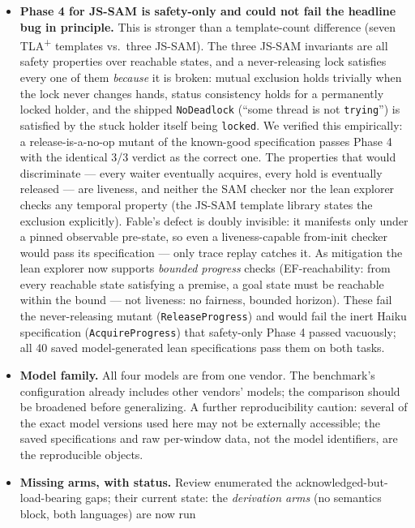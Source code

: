 \documentclass[11pt]{article}
\newcommand{\jssam}{JS-SAM}
\newcommand{\tlaplus}{TLA\texorpdfstring{\textsuperscript{+}}{+}}
\begin{document}
\begin{itemize}
  methodological question we are putting to the maintainers.
\item \textbf{Phase 4 for \jssam{} is safety-only and could not fail the
  headline bug in principle.} This is stronger than a template-count
  difference (seven \tlaplus{} templates vs.\ three \jssam{}). The three
  \jssam{} invariants are all safety properties over reachable states, and a
  never-releasing lock satisfies every one of them \emph{because} it is
  broken: mutual exclusion holds trivially when the lock never changes
  hands, status consistency holds for a permanently locked holder, and the
  shipped \texttt{NoDeadlock} (``some thread is not \texttt{trying}'') is
  satisfied by the stuck holder itself being \texttt{locked}. We verified
  this empirically: a release-is-a-no-op mutant of the known-good
  specification passes Phase 4 with the identical 3/3 verdict as the correct
  one. The properties that would discriminate --- every waiter eventually
  acquires, every hold is eventually released --- are liveness, and neither
  the SAM checker nor the lean explorer checks any temporal property (the
  \jssam{} template library states the exclusion explicitly). Fable's defect
  is doubly invisible: it manifests only under a pinned observable
  pre-state, so even a liveness-capable from-init checker would pass its
  specification --- only trace replay catches it. As mitigation the lean
  explorer now supports \emph{bounded progress} checks (EF-reachability:
  from every reachable state satisfying a premise, a goal state must be
  reachable within the bound --- not liveness: no fairness, bounded
  horizon). These fail the never-releasing mutant
  (\texttt{ReleaseProgress}) and would fail the inert Haiku specification
  (\texttt{AcquireProgress}) that safety-only Phase 4 passed vacuously; all
  40 saved model-generated lean specifications pass them on both tasks.
\item \textbf{Model family.} All four models are from one vendor. The
  benchmark's configuration already includes other vendors' models; the
  comparison should be broadened before generalizing. A further
  reproducibility caution: several of the exact model versions used here
  may not be externally accessible; the saved specifications and raw
  per-window data, not the model identifiers, are the reproducible objects.
\item \textbf{Missing arms, with status.} Review enumerated the
  acknowledged-but-load-bearing gaps; their current state: the
  \emph{derivation arms} (no semantics block, both languages) are now run

\end{itemize}
\end{document}
